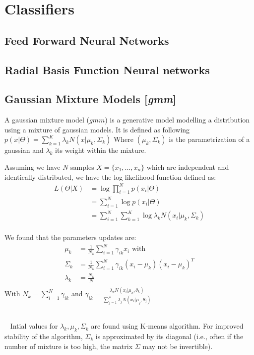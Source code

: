 \documentclass[11pt]{article}
\newcommand{\nllref}[1]{[\small{\textit{#1}}]}
\begin{document}
\section{Classifiers}
\subsection{Feed Forward Neural Networks}
\subsection{Radial Basis Function Neural networks}
\subsection{Gaussian Mixture Models \nllref{gmm}}
A gaussian mixture model ($gmm$) is a generative model modelling a distribution using a mixture of gaussian models. It is defined as following $p(x|\Theta)= \sum_{k=1}^K \lambda _k N(x|\mu _k, \Sigma _k)$ Where $(\mu _k, \Sigma _k)$ is the parametrization of a gaussian and $\lambda _k$ its weight within the mixture.

Assuming we have $N$ samples $X=\{x_1,...,x_n\}$ which are independent and identically distributed, we have the log-likelihood function defined as:
\begin{align*}
L(\Theta | X)&=\log \prod_{i=1}^N p(x_i|\Theta) \\
&=\sum_{i=1}^N \log p(x_i|\Theta) \\
&=\sum_{i=1}^N \sum_{k=1}^K \log \lambda _k N(x_i|\mu _k, \Sigma _k) \\
\end{align*}

We found that the parameters updates are:
\begin{align*}
\mu _ k &= \frac{1}{N_k} \sum_{i=1}^N \gamma _{ik} x_i \text{~with~} \\
\Sigma _k &= \frac{1}{N_k} \sum _{i=1}^N \gamma _{ik}(x_i-\mu _k)(x_i-\mu _k)^T \\
\lambda _k &= \frac{N_k}{N} \\
\end{align*}
With $N_k = \sum _{i=1}^N \gamma _{ik}$ and $\gamma _{ik} = \frac{\lambda_k N(x_i| \mu _k, \theta _k)}{\sum _{j=1}^K \lambda _j N(x_i| \mu _j, \theta _j)}$

~\\~
Intial values for $\lambda_k, \mu_k, \Sigma_k$ are found using K-means algorithm. For improved stability of the algorithm, $\Sigma_k$ is approximated by its diagonal (i.e., often if the number of mixture is too high, the matrix $\Sigma$ may not be invertible).
\end{document}
